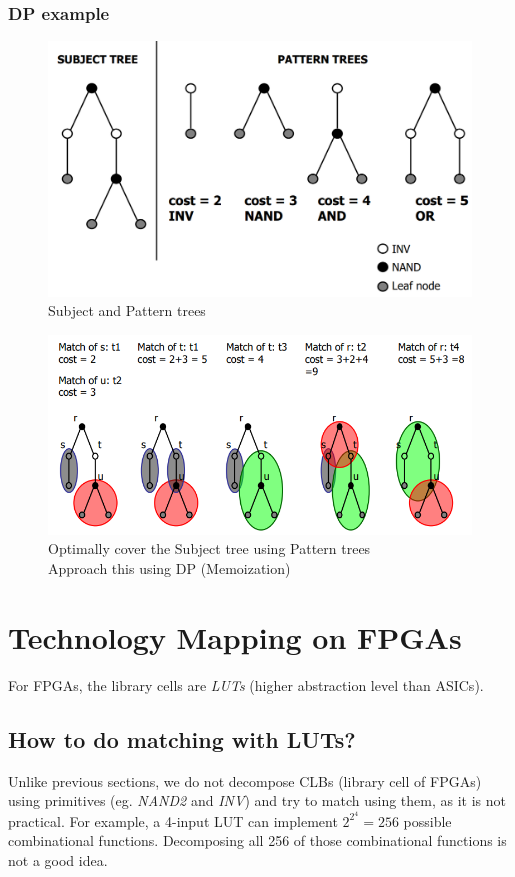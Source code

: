 \documentclass{article}
\begin{document}
\subsubsection{DP example}

\begin{figure}[htp]
    \centering
    \includegraphics[width=12cm, scale=1]{S6/dp_start.PNG}
    \caption{Subject and Pattern trees}
\end{figure}

\begin{figure}[htp]
    \centering
    \includegraphics[width=12cm, scale=1]{S6/dp.PNG}
    \caption{Optimally cover the Subject tree using Pattern trees\\
                Approach this using DP (Memoization)}
\end{figure}

\newpage
\section{Technology Mapping on FPGAs}
For FPGAs, the library cells are \textit{LUTs} (higher abstraction level than ASICs).

\subsection{How to do matching with LUTs?}
Unlike previous sections, we do not decompose CLBs (library cell of FPGAs) using primitives (eg. \textit{NAND2} and \textit{INV}) and try to match using them, as it is not practical.
For example, a 4-input LUT can implement $2^{2^{4}} = 256$ possible combinational functions. Decomposing all 256 of those combinational functions is not a good idea.
\end{document}
